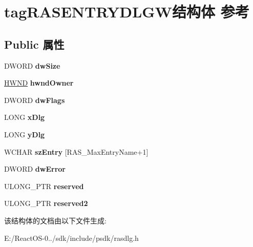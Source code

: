 \hypertarget{structtag_r_a_s_e_n_t_r_y_d_l_g_w}{}\section{tag\+R\+A\+S\+E\+N\+T\+R\+Y\+D\+L\+G\+W结构体 参考}
\label{structtag_r_a_s_e_n_t_r_y_d_l_g_w}
\subsection*{Public 属性}
\begin{DoxyCompactItemize}
\item 
\mbox{\label{structtag_r_a_s_e_n_t_r_y_d_l_g_w_a6227f009056db36ab351b190494bdf25}} 
D\+W\+O\+RD {\bfseries dw\+Size}
\item 
\mbox{\label{structtag_r_a_s_e_n_t_r_y_d_l_g_w_a687c50fb9c03b3b869b773afbb7d2c60}} 
\hyperlink{interfacevoid}{H\+W\+ND} {\bfseries hwnd\+Owner}
\item 
\mbox{\label{structtag_r_a_s_e_n_t_r_y_d_l_g_w_a14243e2eb4397398a350a1c895d59651}} 
D\+W\+O\+RD {\bfseries dw\+Flags}
\item 
\mbox{\label{structtag_r_a_s_e_n_t_r_y_d_l_g_w_ad0e9f0d8ef1faacb7cdd007b9dd17121}} 
L\+O\+NG {\bfseries x\+Dlg}
\item 
\mbox{\label{structtag_r_a_s_e_n_t_r_y_d_l_g_w_aaf90dcbd500dc76f8618871694153aca}} 
L\+O\+NG {\bfseries y\+Dlg}
\item 
\mbox{\label{structtag_r_a_s_e_n_t_r_y_d_l_g_w_abfdede2ca1cf9e2da2f65d35eb50b810}} 
W\+C\+H\+AR {\bfseries sz\+Entry} \mbox{[}R\+A\+S\+\_\+\+Max\+Entry\+Name+1\mbox{]}
\item 
\mbox{\label{structtag_r_a_s_e_n_t_r_y_d_l_g_w_a6fc289f153f8dec3dd9d67d311e9abfe}} 
D\+W\+O\+RD {\bfseries dw\+Error}
\item 
\mbox{\label{structtag_r_a_s_e_n_t_r_y_d_l_g_w_afde890347ba1c3ad5bc21fcc8d690e07}} 
U\+L\+O\+N\+G\+\_\+\+P\+TR {\bfseries reserved}
\item 
\mbox{\label{structtag_r_a_s_e_n_t_r_y_d_l_g_w_a7a0b8e79528cdd19f876950d43c04eb5}} 
U\+L\+O\+N\+G\+\_\+\+P\+TR {\bfseries reserved2}
\end{DoxyCompactItemize}


该结构体的文档由以下文件生成\+:\begin{DoxyCompactItemize}
\item 
E\+:/\+React\+O\+S-\/0../sdk/include/psdk/rasdlg.\+h\end{DoxyCompactItemize}
